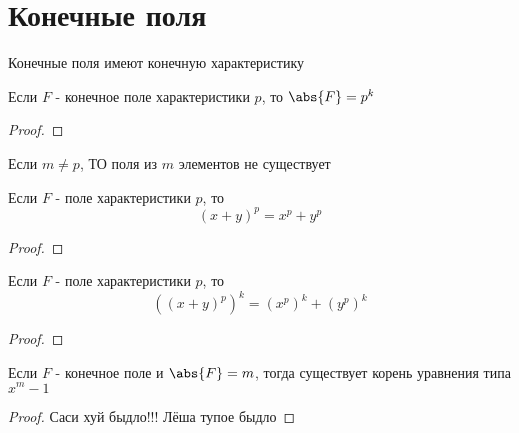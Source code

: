 \documentclass[../main/document.tex]{subfiles}
\begin{document}
\section{Конечные поля}

\begin{dfn}

\end{dfn}

\begin{cnsq}
Конечные поля имеют конечную характеристику
\end{cnsq}

\begin{thm}
Если $F$ - конечное поле характеристики $p$, то $\abs{F}=p^k$
\begin{proof}

\end{proof}
\end{thm}
\begin{cnsq}
Если $m\neq p$, ТО поля из $m$ элементов не существует
\end{cnsq}
\begin{thm}
Если $F$ - поле характеристики $p$, то
$$(x+y)^p=x^p+y^p$$
\begin{proof}

\end{proof}
\end{thm}
\begin{thm}
Если $F$ - поле характеристики $p$, то
$$({(x+y)^p})^k=({x^p})^k+({y^p})^k$$
\begin{proof}

\end{proof}
\end{thm}
\begin{thm}
Если $F$ - конечное поле и $\abs{F}=m$, тогда существует корень уравнения типа $x^m-1$
\begin{proof}
Саси хуй быдло!!!
Лёша тупое быдло
\end{proof}
\end{thm}
\end{document}
